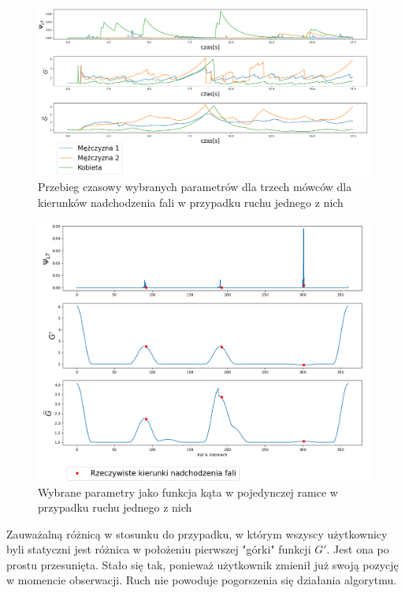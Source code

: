 \begin{figure}[h!]
    \centering
    \includegraphics[width=\textwidth]{Images/moving_params_in_time.png}
    \caption{Przebieg czasowy wybranych parametrów dla trzech mówców dla kierunków nadchodzenia fali w przypadku ruchu jednego z nich}
    \label{fig:moving_params_in_time}
\end{figure}

\begin{figure}[h!]
    \centering
    \includegraphics[width=\textwidth]{Images/moving_params_in_angle.png}
    \caption{Wybrane parametry jako funkcja kąta w pojedynczej ramce w przypadku ruchu jednego z nich}
    \label{fig:moving_params_in_angle}
\end{figure}

Zauważalną różnicą w stosunku do przypadku, w którym wszyscy użytkownicy byli statyczni jest różnica w położeniu pierwszej "górki" funkcji $G'$. Jest ona po prostu przesunięta. Stało się tak, ponieważ użytkownik zmienił już swoją pozycję w momencie obserwacji. Ruch nie powoduje pogorszenia się działania algorytmu.

